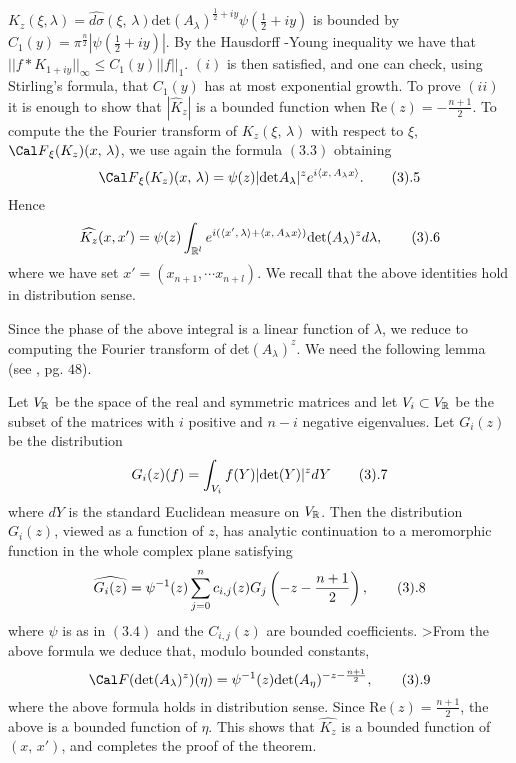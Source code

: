\newline $K_z(\xi,\lambda)=
\widehat{d\sigma}(\xi,\,\lambda)\text{det}(A_\lambda)^{\frac 1 2 +iy}
\psi(\frac{1}{2}+iy)$  is bounded by $C_1(y)=\pi^{\frac{n}{2}} 
|\psi(\frac{1}{2}+iy)|$.
By the Hausdorff -Young inequality we have that $||f*K_{1+iy}||_{\infty}\leq C_1(y)||f||_{1}$. $ (i)$  is then  satisfied, and one can check, using 
Stirling's formula, that $C_1(y)$ has at most exponential growth.
\medskip
To prove $(ii)$ it is enough to show that  
$|\widehat K_z|$ is a bounded function when Re$(z)=-\frac{n+1}{2}$.
To compute the the Fourier transform of 
$K_z(\xi,\,\lambda)$ with respect to $\xi $, 
${\Cal F}_\xi( K_z)(x,\,\lambda)$,  we use again the formula $(3.3)$ obtaining
$$
{\Cal F}_\xi( K_z)(x,\,\lambda)= \psi(z)
|\text{det}A_\lambda|^{z}e^{i\langle x,\, A_{\lambda}x\rangle}.
\tag 3.5
$$
Hence 
$$
\widehat{K_z}(x, x') = \psi(z) 
\int_{{\Bbb R}^l} e^{i(
\langle x',\,\lambda\rangle+ \langle x, \, A_\lambda x\rangle)}
\text{det}(A_\lambda)^zd\lambda,
\tag 3.6
$$
where we have set $x'=(x_{n+1},\cdots x_{n+l})$. We recall that the above 
identities hold in distribution sense.
\par
Since the phase  of the above integral is  a linear  function of $\lambda$,
we reduce to computing the Fourier transform of 
det$(A_\lambda)^z$. 
We need the following lemma (see \cite{TS},  pg. $48$). 

 Let  $V_{\Bbb R}$  be the space of the
real and symmetric matrices and let $V_i\subset V_{\Bbb R}$ 
be the subset of  the   matrices with $i$ positive and $n-i$ negative eigenvalues. Let $G_i(z)$ be the distribution 
$$
G_i(z)(f) = \int_{V_i}f(Y)|\text{det}(Y)|^zdY
\tag 3.7
$$
where $dY$ is the standard Euclidean measure on $V_{\Bbb R}$. 
Then the distribution  $G_i(z)$, viewed as a function of $z$, 
has analytic continuation to a meromorphic function in the whole complex plane 
satisfying 
$$ 
\widehat{G_i(z)}
= 
\psi^{-1}(z)
\sum_{j=0}^{n} c_{i,j}(z)G_j\left(-z-\frac{n+1}{2}\right),
\tag 3.8
$$
where $\psi$ is as in $(3.4)$ and the $C_{i,j}(z)$ are bounded coefficients.
\endproclaim
>From the above formula we deduce that, modulo bounded constants, 
$$
{\Cal F}(\text{det}(A_\lambda)^z )(\eta)= 
\psi^{-1}(z)\text{det}(A_{\eta})^{-z-\frac{n+1}{2}},
\tag 3.9
$$
where the above formula holds in distribution sense.
Since Re$(z) =\frac{n+1}{2}$, the above is a bounded function of $\eta$.
This shows that $\widehat{K_z}$ is a bounded function of $(x,\, x')$, and 
completes the proof  of the theorem.
\enddemo 

